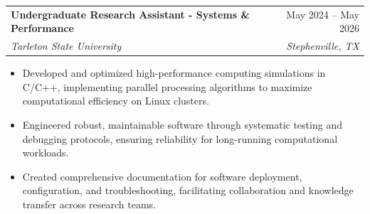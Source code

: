 \documentclass[letterpaper,11pt]{article}
\makeatletter
\newcommand{\resumeItem}[1]{
  \item\small{
    {#1 \vspace{-2pt}}
  }
}
\newcommand{\resumeSubheading}[4]{
  \vspace{-2pt}\item
    \begin{tabular*}{0.97\textwidth}[t]{l@{\extracolsep{\fill}}r}
      \textbf{#1} & #2 \\
      \textit{\small#3} & \textit{\small #4} \\
    \end{tabular*}\vspace{-7pt}
}
\newcommand{\resumeSubSubheading}[2]{
    \item
    \begin{tabular*}{0.97\textwidth}{l@{\extracolsep{\fill}}r}
      \textit{\small#1} & \textit{\small #2} \\
    \end{tabular*}\vspace{-7pt}
}
\newcommand{\resumeSubHeadingListEnd}{\end{itemize}}
\newcommand{\resumeItemListStart}{\begin{itemize}}
\newcommand{\resumeItemListEnd}{\end{itemize}\vspace{-5pt}}
\makeatother
\begin{document}

  \resumeSubheading
  {Undergraduate Research Assistant - Systems \& Performance}{May 2024 -- May 2026}
	{Tarleton State University}{Stephenville, TX}
	\resumeItemListStart
	\resumeItem{Developed and optimized high-performance computing simulations in C/C++, implementing parallel processing algorithms to maximize computational efficiency on Linux clusters.}
	\resumeItem{Engineered robust, maintainable software through systematic testing and debugging protocols, ensuring reliability for long-running computational workloads.}
	\resumeItem{Created comprehensive documentation for software deployment, configuration, and troubleshooting, facilitating collaboration and knowledge transfer across research teams.}
	\resumeItemListEnd
	\vspace{-1pt}
      

    
\end{document}
